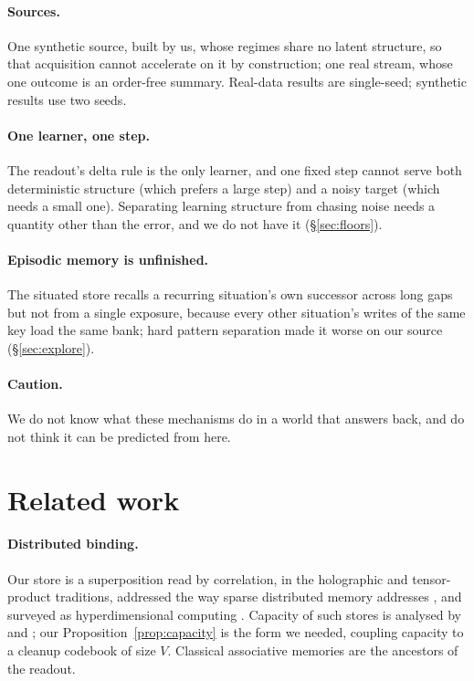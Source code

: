 \documentclass[11pt,a4paper]{article}
\theoremstyle{plain}
\theoremstyle{definition}
\theoremstyle{remark}
\begin{document}
\paragraph{Sources.} One synthetic source, built by us, whose regimes share no
latent structure, so that acquisition cannot accelerate on it by construction;
one real stream, whose one outcome is an order-free summary. Real-data results
are single-seed; synthetic results use two seeds.

\paragraph{One learner, one step.} The readout's delta rule is the only learner,
and one fixed step cannot serve both deterministic structure (which prefers a
large step) and a noisy target (which needs a small one). Separating learning
structure from chasing noise needs a quantity other than the error, and we do
not have it (\S\ref{sec:floors}).

\paragraph{Episodic memory is unfinished.} The situated store recalls a
recurring situation's own successor across long gaps but not from a single
exposure, because every other situation's writes of the same key load the same
bank; hard pattern separation made it worse on our source (\S\ref{sec:explore}).

\paragraph{Caution.} We do not know what these mechanisms do in a world that
answers back, and do not think it can be predicted from here.

\section{Related work}

\paragraph{Distributed binding.} Our store is a superposition read by
correlation, in the holographic \citep{plate1995holographic} and tensor-product
\citep{smolensky1990tensor} traditions, addressed the way sparse distributed
memory addresses \citep{kanerva1988sparse}, and surveyed as hyperdimensional
computing \citep{kanerva2009hyperdimensional,gayler2003vector,%
eliasmith2013build,kleyko2023survey}. Capacity of such stores is analysed by
\citet{plate1995holographic} and \citet{frady2018theory}; our
Proposition~\ref{prop:capacity} is the form we needed, coupling capacity to a
cleanup codebook of size $V$. Classical associative memories
\citep{willshaw1969non,hopfield1982neural,kohonen1972correlation} are the
ancestors of the readout.
\end{document}
